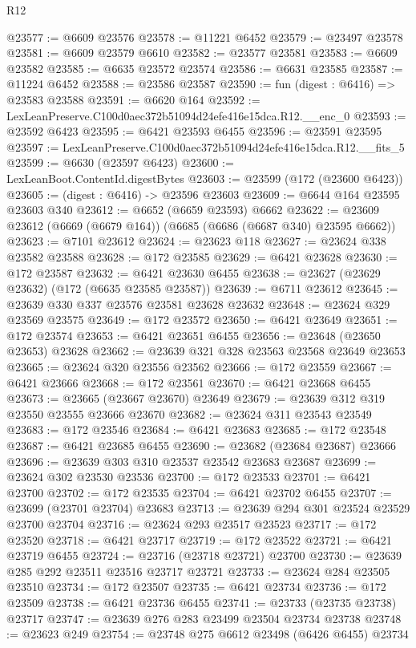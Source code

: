 \begin{lexlean}{R12}
\begin{coremodule}
@23577 := @6609 @23576
@23578 := @11221 @6452
@23579 := @23497 @23578
@23581 := @6609 @23579 @6610
@23582 := @23577 @23581
@23583 := @6609 @23582
@23585 := @6635 @23572 @23574
@23586 := @6631 @23585
@23587 := @11224 @6452
@23588 := @23586 @23587
@23590 := fun (digest : @6416) => @23583 @23588
@23591 := @6620 @164
@23592 := LexLeanPreserve.C100d0aec372b51094d24efe416e15dca.R12.__enc_0
@23593 := @23592 @6423
@23595 := @6421 @23593 @6455
@23596 := @23591 @23595
@23597 := LexLeanPreserve.C100d0aec372b51094d24efe416e15dca.R12.__fits_5
@23599 := @6630 (@23597 @6423)
@23600 := LexLeanBoot.ContentId.digestBytes
@23603 := @23599 (@172 (@23600 @6423))
@23605 := (digest : @6416) -> @23596 @23603
@23609 := @6644 @164 @23595 @23603 @340
@23612 := @6652 (@6659 @23593) @6662
@23622 := @23609 @23612 (@6669 (@6679 @164)) (@6685 (@6686 (@6687 @340) @23595 @6662))
@23623 := @7101 @23612
@23624 := @23623 @118
@23627 := @23624 @338 @23582 @23588
@23628 := @172 @23585
@23629 := @6421 @23628
@23630 := @172 @23587
@23632 := @6421 @23630 @6455
@23638 := @23627 (@23629 @23632) (@172 (@6635 @23585 @23587))
@23639 := @6711 @23612
@23645 := @23639 @330 @337 @23576 @23581 @23628 @23632
@23648 := @23624 @329 @23569 @23575
@23649 := @172 @23572
@23650 := @6421 @23649
@23651 := @172 @23574
@23653 := @6421 @23651 @6455
@23656 := @23648 (@23650 @23653) @23628
@23662 := @23639 @321 @328 @23563 @23568 @23649 @23653
@23665 := @23624 @320 @23556 @23562
@23666 := @172 @23559
@23667 := @6421 @23666
@23668 := @172 @23561
@23670 := @6421 @23668 @6455
@23673 := @23665 (@23667 @23670) @23649
@23679 := @23639 @312 @319 @23550 @23555 @23666 @23670
@23682 := @23624 @311 @23543 @23549
@23683 := @172 @23546
@23684 := @6421 @23683
@23685 := @172 @23548
@23687 := @6421 @23685 @6455
@23690 := @23682 (@23684 @23687) @23666
@23696 := @23639 @303 @310 @23537 @23542 @23683 @23687
@23699 := @23624 @302 @23530 @23536
@23700 := @172 @23533
@23701 := @6421 @23700
@23702 := @172 @23535
@23704 := @6421 @23702 @6455
@23707 := @23699 (@23701 @23704) @23683
@23713 := @23639 @294 @301 @23524 @23529 @23700 @23704
@23716 := @23624 @293 @23517 @23523
@23717 := @172 @23520
@23718 := @6421 @23717
@23719 := @172 @23522
@23721 := @6421 @23719 @6455
@23724 := @23716 (@23718 @23721) @23700
@23730 := @23639 @285 @292 @23511 @23516 @23717 @23721
@23733 := @23624 @284 @23505 @23510
@23734 := @172 @23507
@23735 := @6421 @23734
@23736 := @172 @23509
@23738 := @6421 @23736 @6455
@23741 := @23733 (@23735 @23738) @23717
@23747 := @23639 @276 @283 @23499 @23504 @23734 @23738
@23748 := @23623 @249
@23754 := @23748 @275 @6612 @23498 (@6426 @6455) @23734

\end{coremodule}
\end{lexlean}
